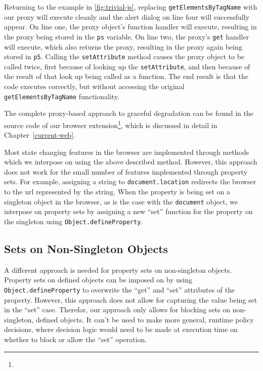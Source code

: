 Returning to the example in \ref{fig:trivial-js}, replacing
\texttt{getElementsByTagName} with our proxy will execute cleanly and the alert
dialog on line four will successfully appear.  On line one, the proxy object's
function handler will execute, resulting in the proxy being stored in the
\texttt{ps} variable.  On line two, the proxy's \texttt{get} handler will
execute, which also returns the proxy, resulting in the proxy again being
stored in \texttt{p5}.  Calling the \texttt{setAttribute} method causes the
proxy object to be called twice, first because of looking up the
\texttt{setAttribute}, and then because of the result of that look up being
called as a function.  The end result is that the code executes correctly, but
without accessing the original \texttt{getElementsByTagName} functionality.

The complete proxy-based approach to graceful degradation can be found in
the source code of our browser extension\footnote{\ExtensionSourceUrl}, which
is discussed in detail in Chapter~\ref{current-web}.

Most state changing features in the browser are implemented through methods
which we interpose on using the above described method.  However, this approach
does not work for the small number of features implemented through property sets.
For example, assigning a string to \texttt{document.location} redirects
the browser to the \gls{url} represented by the string.  When the property is
being set on a singleton object in the browser, as is the case with the
\texttt{document} object, we interpose on property sets by assigning a new
``set'' function for the property on the singleton using
\texttt{Object.defineProperty}.


\subsection{Sets on Non-Singleton Objects}
\label{cost-benefit:intercepting-js:proxy-non-singletons}
A different approach is needed for property sets on non-singleton objects.
Property sets on \WAPI defined objects can be imposed on by using \texttt{Object.defineProperty}
to overwrite the ``get'' and ``set'' attributes of the property.  However,
this approach does not allow for capturing the value being set in the ``set''
case.  Therefor, our approach only allows for blocking sets on non-singleton,
\WAPI defined objects.  It can't be used to make more general, runtime policy
decisions, where decision logic would need to be made at execution time on
whether to block or allow the ``set'' operation.
